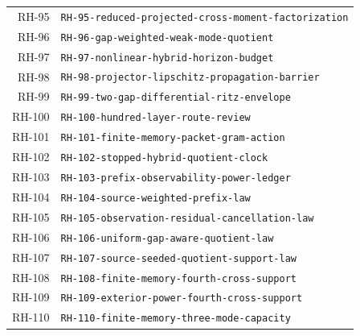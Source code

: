 \begin{longtable}{r >{\raggedright\arraybackslash}p{}}
RH-95 & \texttt{RH-\allowbreak{}95-\allowbreak{}reduced-\allowbreak{}projected-\allowbreak{}cross-\allowbreak{}moment-\allowbreak{}factorization}\\
RH-96 & \texttt{RH-\allowbreak{}96-\allowbreak{}gap-\allowbreak{}weighted-\allowbreak{}weak-\allowbreak{}mode-\allowbreak{}quotient}\\
RH-97 & \texttt{RH-\allowbreak{}97-\allowbreak{}nonlinear-\allowbreak{}hybrid-\allowbreak{}horizon-\allowbreak{}budget}\\
RH-98 & \texttt{RH-\allowbreak{}98-\allowbreak{}projector-\allowbreak{}lipschitz-\allowbreak{}propagation-\allowbreak{}barrier}\\
RH-99 & \texttt{RH-\allowbreak{}99-\allowbreak{}two-\allowbreak{}gap-\allowbreak{}differential-\allowbreak{}ritz-\allowbreak{}envelope}\\
RH-100 & \texttt{RH-\allowbreak{}100-\allowbreak{}hundred-\allowbreak{}layer-\allowbreak{}route-\allowbreak{}review}\\
RH-101 & \texttt{RH-\allowbreak{}101-\allowbreak{}finite-\allowbreak{}memory-\allowbreak{}packet-\allowbreak{}gram-\allowbreak{}action}\\
RH-102 & \texttt{RH-\allowbreak{}102-\allowbreak{}stopped-\allowbreak{}hybrid-\allowbreak{}quotient-\allowbreak{}clock}\\
RH-103 & \texttt{RH-\allowbreak{}103-\allowbreak{}prefix-\allowbreak{}observability-\allowbreak{}power-\allowbreak{}ledger}\\
RH-104 & \texttt{RH-\allowbreak{}104-\allowbreak{}source-\allowbreak{}weighted-\allowbreak{}prefix-\allowbreak{}law}\\
RH-105 & \texttt{RH-\allowbreak{}105-\allowbreak{}observation-\allowbreak{}residual-\allowbreak{}cancellation-\allowbreak{}law}\\
RH-106 & \texttt{RH-\allowbreak{}106-\allowbreak{}uniform-\allowbreak{}gap-\allowbreak{}aware-\allowbreak{}quotient-\allowbreak{}law}\\
RH-107 & \texttt{RH-\allowbreak{}107-\allowbreak{}source-\allowbreak{}seeded-\allowbreak{}quotient-\allowbreak{}support-\allowbreak{}law}\\
RH-108 & \texttt{RH-\allowbreak{}108-\allowbreak{}finite-\allowbreak{}memory-\allowbreak{}fourth-\allowbreak{}cross-\allowbreak{}support}\\
RH-109 & \texttt{RH-\allowbreak{}109-\allowbreak{}exterior-\allowbreak{}power-\allowbreak{}fourth-\allowbreak{}cross-\allowbreak{}support}\\
RH-110 & \texttt{RH-\allowbreak{}110-\allowbreak{}finite-\allowbreak{}memory-\allowbreak{}three-\allowbreak{}mode-\allowbreak{}capacity}\\

\end{longtable}
